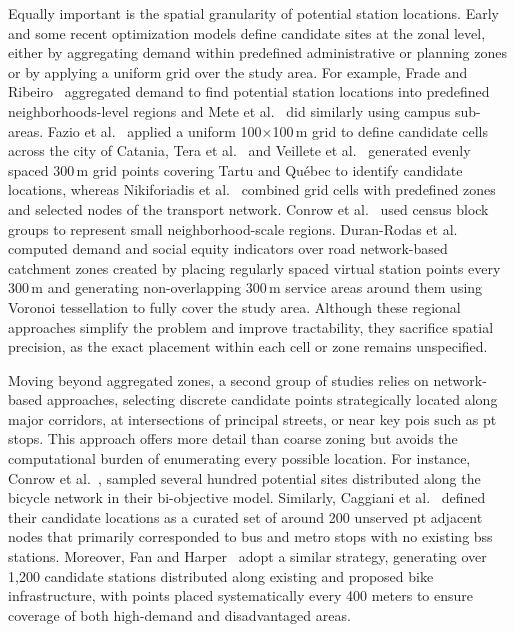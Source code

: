Equally important is the spatial granularity of potential station locations. Early and some recent optimization models define candidate sites at the zonal level, either by aggregating demand within predefined administrative or planning zones or by applying a uniform grid over the study area. For example, Frade and Ribeiro~\cite{Frade2015} aggregated demand to find potential station locations into predefined neighborhoods-level regions and Mete et al.~\cite{Mete2018} did similarly using campus sub-areas. Fazio et al.~\cite{Fazio2021} applied a uniform 100×100\,m grid to define candidate cells across the city of Catania, Tera et al.~\cite{Tera2023} and Veillete et al.~\cite{Veillette2018} generated evenly spaced 300\,m grid points covering Tartu and Québec to identify candidate locations, whereas Nikiforiadis et al.~\cite{Nikiforiadis2021} combined grid cells with predefined zones and selected nodes of the transport network. Conrow et al.~\cite{Conrow2018} used census block groups to represent small neighborhood-scale regions. Duran-Rodas et al.~\cite{Duran-Rodas2021} computed demand and social equity indicators over road network-based catchment zones created by placing regularly spaced virtual station points every 300\,m and generating non-overlapping 300\,m service areas around them using Voronoi tessellation to fully cover the study area. Although these regional approaches simplify the problem and improve tractability, they sacrifice spatial precision, as the exact placement within each cell or zone remains unspecified.

Moving beyond aggregated zones, a second group of studies relies on network-based approaches, selecting discrete candidate points strategically located along major corridors, at intersections of principal streets, or near key \acp{poi} such as \ac{pt} stops. This approach offers more detail than coarse zoning but avoids the computational burden of enumerating every possible location. For instance, Conrow et al.~\cite{Conrow2018}, sampled several hundred potential sites distributed along the bicycle network in their bi-objective model. Similarly, Caggiani et al.~\cite{Caggiani2020} defined their candidate locations as a curated set of around 200 unserved \ac{pt} adjacent nodes that primarily corresponded to bus and metro stops with no existing \ac{bss} stations. Moreover, Fan and Harper~\cite{Fan2024} adopt a similar strategy, generating over 1,200 candidate stations distributed along existing and proposed bike infrastructure, with points placed systematically every 400 meters to ensure coverage of both high-demand and disadvantaged areas. 

